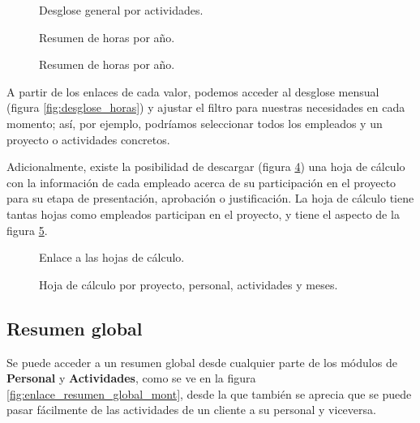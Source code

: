 \begin{figure}
\centering
{}
\caption{Desglose general por actividades.}
\label{fig:consulta_horas_act}
\end{figure}

\begin{figure}
\centering
{}
\caption{Resumen de horas por año.}
\label{fig:horas_resumen_anio}
\end{figure}

\begin{figure}
\centering
{}
\caption{Resumen de horas por año.}
\label{fig:horas_resumen_actividad}
\end{figure}

A partir de los enlaces de cada valor, podemos acceder al desglose mensual
(figura \ref{fig:desglose_horas}) y ajustar el filtro para nuestras necesidades
en cada momento; así, por ejemplo, podríamos seleccionar todos los empleados y
un proyecto o actividades concretos.

Adicionalmente, existe la posibilidad de descargar (figura
\ref{fig:enlace_resumen}) una hoja de cálculo con la información de cada
empleado acerca de su participación en el proyecto para su etapa de
presentación, aprobación o justificación. La hoja de cálculo tiene tantas hojas
como empleados participan en el proyecto, y tiene el aspecto de la figura
\ref{fig:hoja_calculo_proyecto}.

\begin{figure}
\centering
{}
\caption{Enlace a las hojas de cálculo.}
\label{fig:enlace_resumen}
\end{figure}

\begin{figure}
\centering
{}
\caption{Hoja de cálculo por proyecto, personal, actividades y meses.}
\label{fig:hoja_calculo_proyecto}
\end{figure}

\subsection{Resumen global}

Se puede acceder a un resumen global desde cualquier parte de los módulos de
\textbf{Personal} y \textbf{Actividades}, como se ve en la figura
\ref{fig:enlace_resumen_global_mont}, desde la que también se aprecia que se
puede pasar fácilmente de las actividades de un cliente a su personal y
viceversa.

